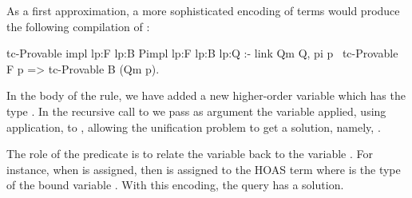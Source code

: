 





As a first approximation, a more sophisticated encoding of \rocq terms would
produce the following compilation of :

\begin{elpicode}
tc-Provable {{impl lp:F lp:B}} {{Pimpl lp:F lp:B lp:Q}} :- 
  link Qm Q, %
  pi p \ tc-Provable F p => tc-Provable B (Qm p).
\end{elpicode}

In the body of the rule, we have added a new higher-order \elpi variable 
which has the type . In the recursive call to
 we pass as argument the variable  applied, using \elpi
application, to , allowing the unification problem  to
get a solution, namely, .

The role of the  predicate is to relate the \elpi variable  back
to the \rocq variable . For instance, when  is assigned, then
 is assigned to the HOAS term  where 
is the type of the bound variable . With this encoding, the
query  has a solution.


